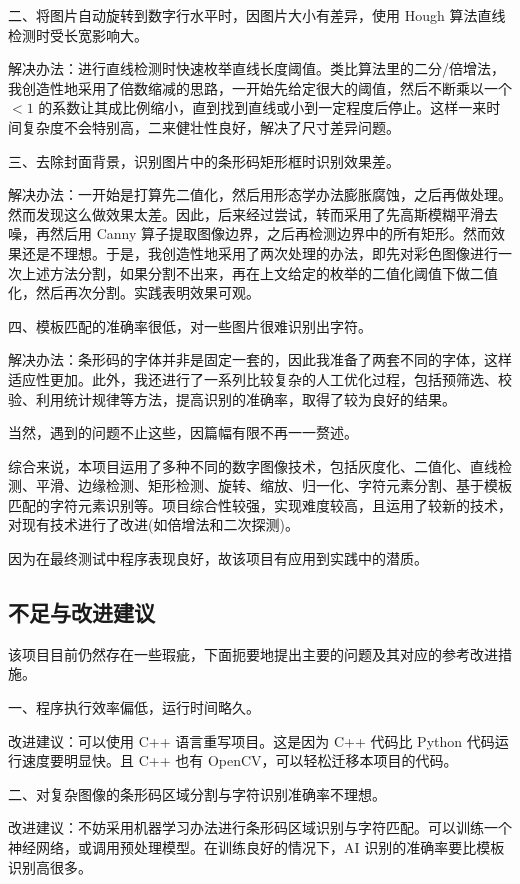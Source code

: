 \documentclass{ctexart}
\begin{document}
二、将图片自动旋转到数字行水平时，因图片大小有差异，使用 Hough 算法直线检测时受长宽影响大。

解决办法：进行直线检测时快速枚举直线长度阈值。类比算法里的二分/倍增法，我创造性地采用了倍数缩减的思路，一开始先给定很大的阈值，然后不断乘以一个 $< 1$ 的系数让其成比例缩小，直到找到直线或小到一定程度后停止。这样一来时间复杂度不会特别高，二来健壮性良好，解决了尺寸差异问题。

三、去除封面背景，识别图片中的条形码矩形框时识别效果差。

解决办法：一开始是打算先二值化，然后用形态学办法膨胀腐蚀，之后再做处理。然而发现这么做效果太差。因此，后来经过尝试，转而采用了先高斯模糊平滑去噪，再然后用 Canny 算子提取图像边界，之后再检测边界中的所有矩形。然而效果还是不理想。于是，我创造性地采用了两次处理的办法，即先对彩色图像进行一次上述方法分割，如果分割不出来，再在上文给定的枚举的二值化阈值下做二值化，然后再次分割。实践表明效果可观。

四、模板匹配的准确率很低，对一些图片很难识别出字符。

解决办法：条形码的字体并非是固定一套的，因此我准备了两套不同的字体，这样适应性更加。此外，我还进行了一系列比较复杂的人工优化过程，包括预筛选、校验、利用统计规律等方法，提高识别的准确率，取得了较为良好的结果。

当然，遇到的问题不止这些，因篇幅有限不再一一赘述。

综合来说，本项目运用了多种不同的数字图像技术，包括灰度化、二值化、直线检测、平滑、边缘检测、矩形检测、旋转、缩放、归一化、字符元素分割、基于模板匹配的字符元素识别等。项目综合性较强，实现难度较高，且运用了较新的技术，对现有技术进行了改进(如倍增法和二次探测)。

因为在最终测试中程序表现良好，故该项目有应用到实践中的潜质。

\subsection{不足与改进建议}
该项目目前仍然存在一些瑕疵，下面扼要地提出主要的问题及其对应的参考改进措施。

一、程序执行效率偏低，运行时间略久。

改进建议：可以使用 C++ 语言重写项目。这是因为 C++ 代码比 Python 代码运行速度要明显快。且 C++ 也有 OpenCV，可以轻松迁移本项目的代码。

二、对复杂图像的条形码区域分割与字符识别准确率不理想。

改进建议：不妨采用机器学习办法进行条形码区域识别与字符匹配。可以训练一个神经网络，或调用预处理模型。在训练良好的情况下，AI 识别的准确率要比模板识别高很多。
\end{document}
